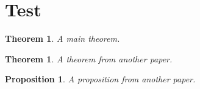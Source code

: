 \documentclass{amsart}
\newtheorem{theor}{Theorem}[section]
\newcounter{other}
\newtheorem{otherth}[other]{Theorem}
\newtheorem{otherp}[other]{Proposition}
\begin{document}
\section{Test}
\begin{theor}A main theorem.\end{theor}
\begin{otherth}A theorem from another paper.\end{otherth}
\begin{otherp}A proposition from another paper.\end{otherp}
\end{document}
